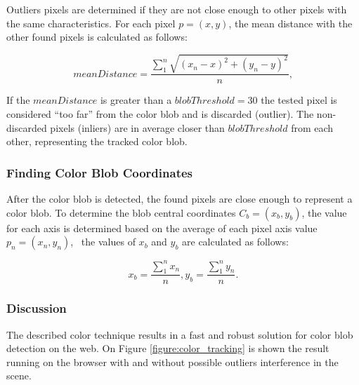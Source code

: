Outliers pixels are determined if they are not close enough to other pixels with the same characteristics. For each pixel $p=(x,y)$, the mean distance with the other found pixels is calculated as follows:

$$meanDistance=\frac{\sum_{1}^{n}\sqrt{(x_n-x)^2 + (y_n-y)^2}} {n},$$

If the $meanDistance$ is greater than a $blobThreshold=30$ the tested pixel is considered ``too far'' from the color blob and is discarded (outlier). The non-discarded pixels (inliers) are in average closer than $blobThreshold$ from each other, representing the tracked color blob.


\subsubsection{Finding Color Blob Coordinates}
\label{sub:tracking_library_for_the_web:color_tracking_algorithm:color_blob_detection:finding_color_blobs_coordinates}

After the color blob is detected, the found pixels are close enough to represent a color blob. To determine the blob central coordinates $C_b=(x_b,y_b)$, the value for each axis is determined based on the average of each pixel axis value $p_n=(x_n,y_n)$, \ie\ the values of $x_b$ and $y_b$ are calculated as follows:

$$x_b=\frac{\sum_{1}^{n}x_n}{n}, y_b=\frac{\sum_{1}^{n}y_n}{n}.$$


\subsubsection{Discussion}
\label{sub:tracking_library_for_the_web:color_tracking_algorithm:color_blob_detection:discussion}

The described color technique results in a fast and robust solution for color blob detection on the web. On Figure \ref{figure:color_tracking} is shown the result running on the browser with and without possible outliers interference in the scene.

